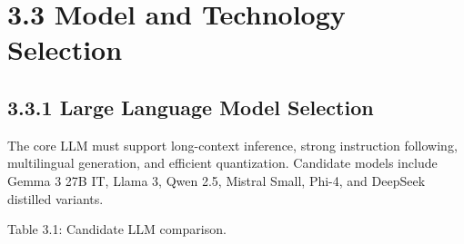 \documentclass[
  letterpaper,
  12pt,
  a4paper,
  openany]{report}
\begin{document}
\section{3.3 Model and Technology
Selection}\label{model-and-technology-selection}

\subsection{3.3.1 Large Language Model
Selection}\label{large-language-model-selection}

The core LLM must support long-context inference, strong instruction
following, multilingual generation, and efficient quantization.
Candidate models include Gemma 3 27B IT, Llama 3, Qwen 2.5, Mistral
Small, Phi-4, and DeepSeek distilled variants.

Table 3.1: Candidate LLM comparison.
\end{document}
